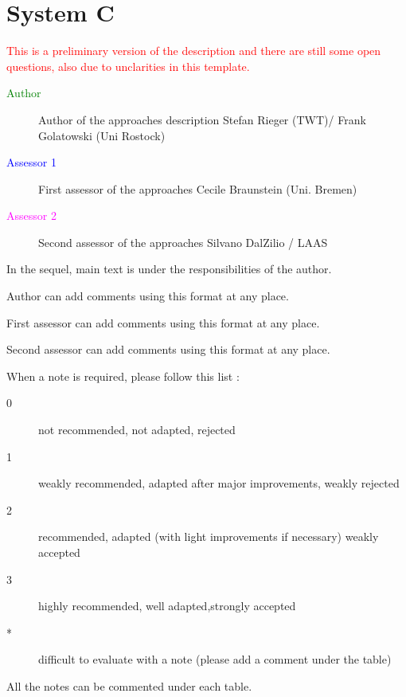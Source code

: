 \chapter{System C}

\textcolor{red}{
This is a preliminary version of the description and there are still some open questions, also due to unclarities in this template.
}

\begin{description}
\item[\textcolor{green}{Author}] Author of the approaches description  Stefan Rieger (TWT)/ Frank Golatowski (Uni Rostock)
\item[\textcolor{blue}{Assessor 1}] First assessor of the approaches Cecile Braunstein (Uni. Bremen)
\item[\textcolor{magenta}{Assessor 2}] Second assessor of the approaches Silvano DalZilio / LAAS
\end{description}

In the sequel, main text is under the responsibilities of the author.

\begin{author_comment}
Author can add comments using this format at any place.
\end{author_comment}

\begin{assessor1}
First assessor can add comments using this format at any place.
\end{assessor1}

\begin{assessor2}
Second assessor can add comments using this format at any place.
\end{assessor2}

When a note is required, please follow this list :
\begin{description}
\item[0] not recommended, not adapted, rejected
\item[1] weakly recommended, adapted after major improvements, weakly rejected
\item[2] recommended, adapted (with light improvements if necessary)  weakly accepted
\item[3] highly recommended, well adapted,strongly accepted
\item[*] difficult to evaluate with a note (please add a comment under the table)
\end{description}

All the notes can be commented under each table.

